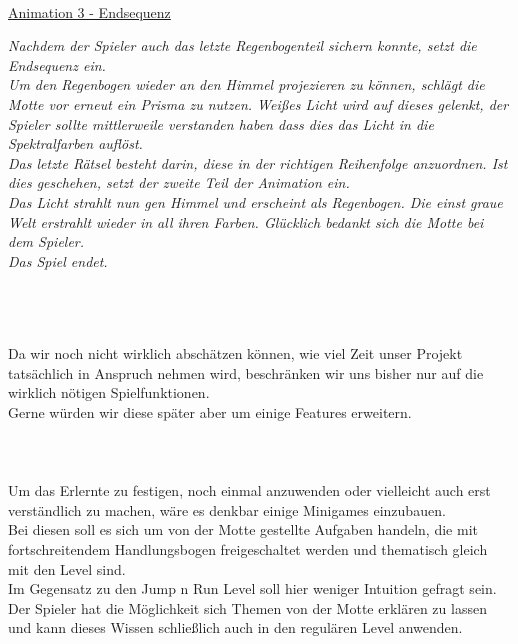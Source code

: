 \documentclass[10pt,a4paper,notitlepage]{report}
\begin{document}
	\\
	\underline{Animation 3 - Endsequenz}\
	\\
	\begin{flushright}
	\textit{Nachdem der Spieler auch das letzte Regenbogenteil sichern konnte,
	setzt die Endsequenz ein.\\
	Um den Regenbogen wieder an den Himmel projezieren zu können,
	schlägt die Motte vor erneut ein Prisma zu nutzen.
	Weißes Licht wird auf dieses gelenkt, der Spieler sollte mittlerweile
	verstanden haben dass dies das Licht in die Spektralfarben auflöst.\\
	Das letzte Rätsel besteht darin, diese in der richtigen Reihenfolge anzuordnen.
	Ist dies geschehen, setzt der zweite Teil der Animation ein.\\
	Das Licht strahlt nun gen Himmel und erscheint als Regenbogen.
	Die einst graue Welt erstrahlt wieder in all ihren Farben.
	Glücklich bedankt sich die Motte bei dem Spieler.\\
	Das Spiel endet.}
	\end{flushright}\
	\clearpage\
	\marginpar{\vspace{3.0mm} \color{orange}\rule{0.8mm}{53.3mm} \\[3mm] \color{hellorange}\rule{0.8mm}{170mm}}
	\\
	\
	\\\\
	\Text
		Da wir noch nicht wirklich abschätzen können, wie viel Zeit unser Projekt tatsächlich in Anspruch nehmen wird, 
	beschränken wir uns bisher nur auf die wirklich nötigen Spielfunktionen. \\
	Gerne würden wir diese später aber um einige Features erweitern.
	\\\\
	\Drei{3.1. Minigames}\
	\\\\
	\Text
		Um das Erlernte zu festigen, noch einmal anzuwenden oder vielleicht auch erst verständlich zu machen, wäre es denkbar einige Minigames einzubauen.\\ 
	Bei diesen soll es sich um von der Motte gestellte Aufgaben handeln, die mit fortschreitendem Handlungsbogen freigeschaltet werden 
	und thematisch gleich mit den Level sind.\\
	Im Gegensatz zu den Jump n Run Level soll hier weniger Intuition gefragt sein. Der Spieler hat die Möglichkeit sich Themen von der Motte 
	erklären zu lassen und kann dieses Wissen schließlich auch in den regulären Level anwenden.\\
\end{document}
